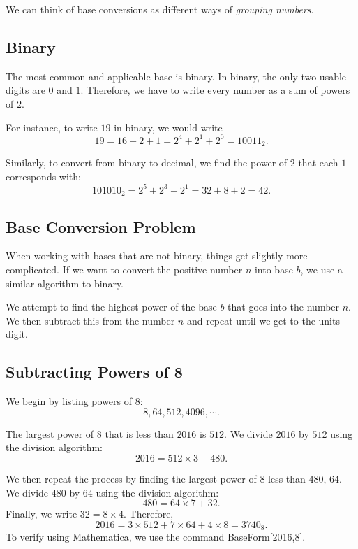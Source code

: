 We can think of base conversions as different ways of \textit{grouping numbers}.
\clearpage

\subsection{Binary}

The most common and applicable base is binary. In binary, the only two usable digits are $0$ and $1$. Therefore, we have to write every number as a sum of powers of $2$. 

For instance, to write $19$ in binary, we would write $$19=16+2+1=2^4+2^1+2^0=10011_2.$$  

Similarly, to convert from binary to decimal, we find the power of $2$ that each $1$ corresponds with: $$101010_2=2^5+2^3+2^1=32+8+2=42.$$  

\subsection{Base Conversion Problem}

When working with bases that are not binary, things get slightly more complicated. If we want to convert the positive number $n$ into base $b$, we use a similar algorithm to binary.  

We attempt to find the highest power of the base $b$ that goes into the number $n$. We then subtract this from the number $n$ and repeat until we get to the units digit. 


\clearpage

\subsection{Subtracting Powers of 8}

We begin by listing powers of $8$:  $$8, 64, 512, 4096, \cdots.$$  

The largest power of $8$ that is less than $2016$ is $512$. We divide $2016$ by $512$ using the division algorithm:
$$2016=512\times 3+480.$$  

\clearpage

We then repeat the process by finding the largest power of $8$ less than $480$, $64$. We divide $480$ by $64$ using the division algorithm: $$480=64\times 7+32.$$ 
Finally, we write $32=8\times 4$.  Therefore, $$2016=3\times 512+7\times 64+4\times 8=3740_8.$$ To verify using Mathematica, we use the command BaseForm[2016,8]. 

